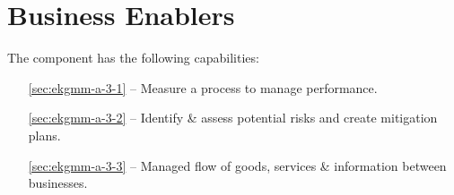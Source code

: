 \chapter{Business Enablers}\label{ch:ekgmm-a-3} %

The  component has the following capabilities:

\begin{itemize}[leftmargin=.5in]
  \item [\ref{sec:ekgmm-a-3-1}]  -- Measure a process to manage performance.
  \item [\ref{sec:ekgmm-a-3-2}]  -- Identify \& assess potential risks and create mitigation plans.
  \item [\ref{sec:ekgmm-a-3-3}]  -- Managed flow of goods, services \& information between businesses.
\end{itemize}




